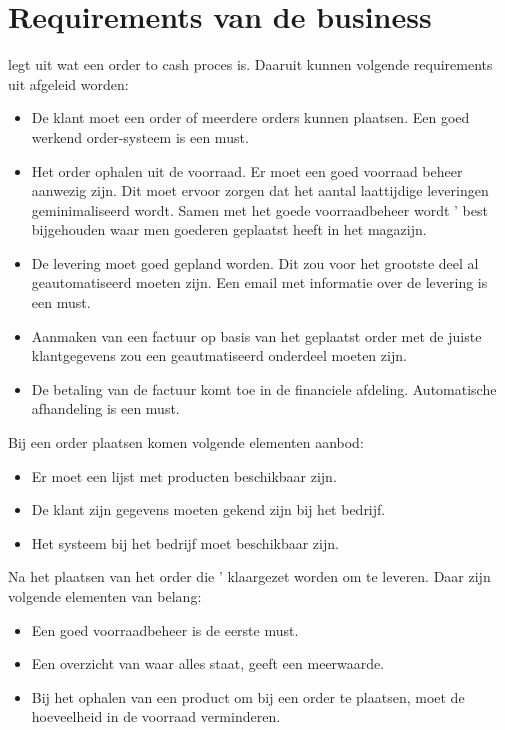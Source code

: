 \section{Requirements van de business}
\textcite{Biedron2018} legt uit wat een order to cash proces is. Daaruit kunnen volgende requirements uit afgeleid worden:
\begin{itemize}
	\item De klant moet een order of meerdere orders kunnen plaatsen. Een goed werkend order-systeem is een must.
	\item Het order ophalen uit de voorraad. Er moet een goed voorraad beheer aanwezig zijn. Dit moet ervoor zorgen dat het aantal laattijdige leveringen geminimaliseerd wordt. Samen met het goede voorraadbeheer wordt ' best bijgehouden waar men goederen geplaatst heeft in het magazijn.
	\item De levering moet goed gepland worden. Dit zou voor het grootste deel al geautomatiseerd moeten zijn. Een email met informatie over de levering is een must. 
	\item Aanmaken van een factuur op basis van het geplaatst order met de juiste klantgegevens zou een geautmatiseerd onderdeel moeten zijn. 
	\item De betaling van de factuur komt toe in de financiele afdeling. Automatische afhandeling is een must.
\end{itemize}
Bij een order plaatsen komen volgende elementen aanbod:
\begin{itemize}
	\item Er moet een lijst met producten beschikbaar zijn.
	\item De klant zijn gegevens moeten gekend zijn bij het bedrijf.
	\item Het systeem bij het bedrijf moet beschikbaar zijn.
\end{itemize}
Na het plaatsen van het order die ' klaargezet worden om te leveren. Daar zijn volgende elementen van belang:
\begin{itemize}
	\item Een goed voorraadbeheer is de eerste must.
	\item Een overzicht van waar alles staat, geeft een meerwaarde.
	\item Bij het ophalen van een product om bij een order te plaatsen, moet de hoeveelheid in de voorraad verminderen.
\end{itemize}
